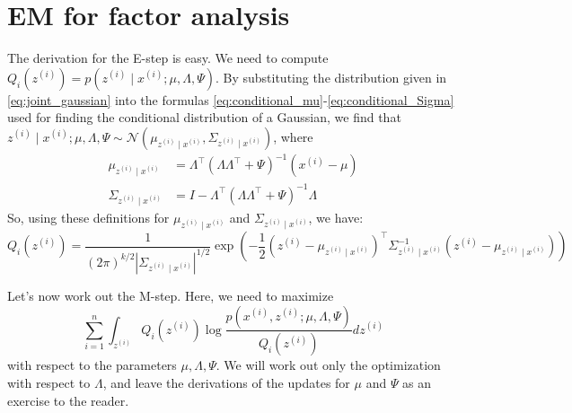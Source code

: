 \section{EM for factor analysis}
The derivation for the E-step is easy. We need to compute $Q_i(z^{(i)}) = p(z^{(i)} \mid x^{(i)}; \mu ,\Lambda , \Psi)$.
By substituting the distribution given in \cref{eq:joint_gaussian}
into the formulas \ref{eq:conditional_mu}-\ref{eq:conditional_Sigma} used for finding the conditional distribution of a
Gaussian, we find that $z^{(i)} \mid x^{(i)}; \mu ,\Lambda , \Psi \sim \mathcal N (\mu_{z^{(i)} \mid x^{(i)}}, \Sigma_{z^{(i)}\mid x^{(i)}})$, where
\begin{align*}
    \mu_{z^{(i)} \mid x^{(i)}} &= \Lambda^\top (\Lambda \Lambda^\top + \Psi)^{-1} (x^{(i)} - \mu)\\
    \Sigma_{z^{(i)} \mid x^{(i)}} &= I - \Lambda^\top (\Lambda \Lambda^\top + \Psi)^{-1}\Lambda
\end{align*}
So, using these definitions for $\mu_{z^{(i)} \mid x^{(i)}}$ and $\Sigma_{z^{(i)} \mid x^{(i)}}$, we have:
\[
    Q_i(z^{(i)}) = \frac{1}{(2\pi)^{k/2}|\Sigma_{z^{(i)} \mid x^{(i)}}|^{1/2}}\exp\left(-\frac{1}{2} (z^{(i)} - \mu_{z^{(i)} \mid x^{(i)}})^\top\Sigma^{-1}_{z^{(i)} \mid x^{(i)}} (z^{(i)} - \mu_{z^{(i)} \mid x^{(i)}})\right)
\]

Let's now work out the M-step. Here, we need to maximize
\begin{equation}\label{eq:m_step_fa_max}
    \sum^n_{i=1}\int_{z^{(i)}} Q_i(z^{(i)})\log \frac{p(x^{(i)}, z^{(i)}; \mu ,\Lambda , \Psi)}{Q_i(z^{(i)})}dz^{(i)}
\end{equation}
with respect to the parameters $\mu ,\Lambda , \Psi$. We will work out only the optimization with respect to $\Lambda$, and leave the derivations of the updates for $\mu$ and $\Psi$
as an exercise to the reader.

